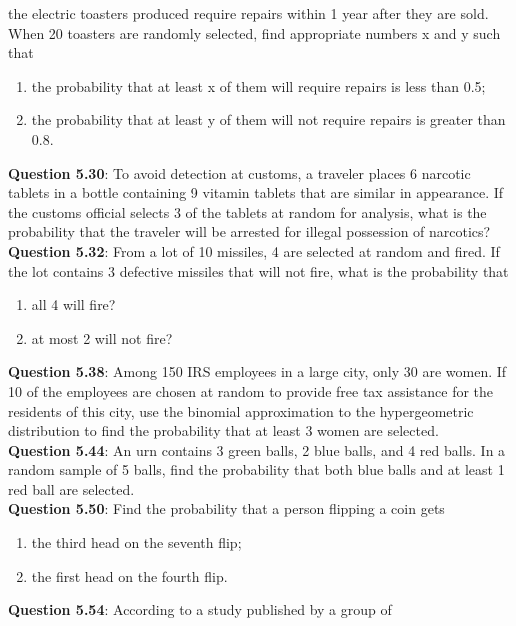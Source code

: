 \documentclass{article}
\begin{document}
    the electric toasters produced require repairs within 1
    year after they are sold. When 20 toasters are randomly 
    selected, find appropriate numbers x and y such
    that
        \begin{enumerate}[label = (\alph*)]
            \item the probability that at least x of them will require
            repairs is less than 0.5;
            \item  the probability that at least y of them will not require
            repairs is greater than 0.8.
        \end{enumerate}
    \textbf{Question 5.30}: To avoid detection at customs, a traveler places
    6 narcotic tablets in a bottle containing 9 vitamin
    tablets that are similar in appearance. If the customs
    official selects 3 of the tablets at random for analysis,
    what is the probability that the traveler will be arrested
    for illegal possession of narcotics?\\
    \textbf{Question 5.32}: From a lot of 10 missiles, 4 are selected at random
    and fired. If the lot contains 3 defective missiles
    that will not fire, what is the probability that
        \begin{enumerate}[label = (\alph*)]
            \item all 4 will fire?
            \item at most 2 will not fire?
        \end{enumerate}
    \textbf{Question 5.38}: Among 150 IRS employees in a large city, only
    30 are women. If 10 of the employees are chosen at
    random to provide free tax assistance for the residents
    of this city, use the binomial approximation to the hypergeometric 
    distribution to find the probability that
    at least 3 women are selected.\\
    \textbf{Question 5.44}: An urn contains 3 green balls, 2 blue balls, and
    4 red balls. In a random sample of 5 balls, find the
    probability that both blue balls and at least 1 red ball
    are selected.\\
    \textbf{Question 5.50}: Find the probability that a person flipping a coin
    gets
        \begin{enumerate}[label = (\alph*)]
            \item the third head on the seventh flip;
            \item the first head on the fourth flip.
        \end{enumerate}
    \textbf{Question 5.54}: According to a study published by a group of
\end{document}
